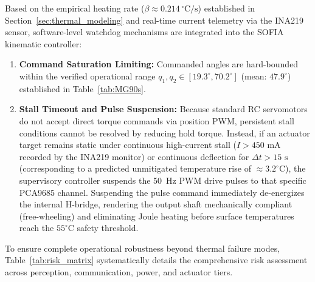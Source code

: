\documentclass[lettersize,journal]{IEEEtran}
\begin{document}
	Based on the empirical heating rate ($\beta \approx 0.214\,^\circ\text{C/s}$) established in Section~\ref{sec:thermal_modeling} and real-time current telemetry via the INA219 sensor, software-level watchdog mechanisms are integrated into the SOFIA kinematic controller:
	\begin{enumerate}
		\item \textbf{Command Saturation Limiting:} Commanded angles are hard-bounded within the verified operational range $q_1, q_2 \in [19.3^\circ, 70.2^\circ]$ (mean: $47.9^\circ$) established in Table~\ref{tab:MG90s}.
		\item \textbf{Stall Timeout and Pulse Suspension:} Because standard RC servomotors do not accept direct torque commands via position PWM, persistent stall conditions cannot be resolved by reducing hold torque. Instead, if an actuator target remains static under continuous high-current stall ($I > 450\text{ mA}$ recorded by the INA219 monitor) or continuous deflection for $\Delta t > 15\text{ s}$ (corresponding to a predicted unmitigated temperature rise of $\approx 3.2^\circ\text{C}$), the supervisory controller suspends the 50~Hz PWM drive pulses to that specific PCA9685 channel. Suspending the pulse command immediately de-energizes the internal H-bridge, rendering the output shaft mechanically compliant (free-wheeling) and eliminating Joule heating before surface temperatures reach the $55^\circ\text{C}$ safety threshold.
	\end{enumerate}
	
	To ensure complete operational robustness beyond thermal failure modes, Table~\ref{tab:risk_matrix} systematically details the comprehensive risk assessment across perception, communication, power, and actuator tiers.
	
\end{document}
